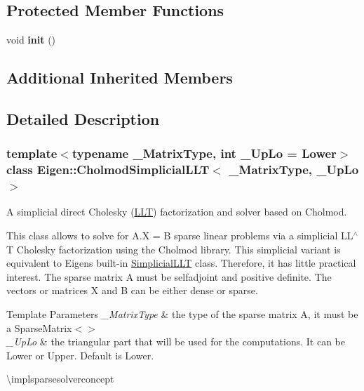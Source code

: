 \subsection*{Protected Member Functions}
\begin{DoxyCompactItemize}
\item 
\mbox{\label{class_eigen_1_1_cholmod_simplicial_l_l_t_a6014655338ba52e480682c73b9da2061}} 
void {\bfseries init} ()
\end{DoxyCompactItemize}
\subsection*{Additional Inherited Members}


\subsection{Detailed Description}
\subsubsection*{template$<$typename \+\_\+\+Matrix\+Type, int \+\_\+\+Up\+Lo = Lower$>$\newline
class Eigen\+::\+Cholmod\+Simplicial\+L\+L\+T$<$ \+\_\+\+Matrix\+Type, \+\_\+\+Up\+Lo $>$}

A simplicial direct Cholesky (\mbox{\hyperlink{class_eigen_1_1_l_l_t}{L\+LT}}) factorization and solver based on Cholmod. 

This class allows to solve for A.\+X = B sparse linear problems via a simplicial L\+L$^\wedge$T Cholesky factorization using the Cholmod library. This simplicial variant is equivalent to Eigen\textquotesingle{}s built-\/in \mbox{\hyperlink{class_eigen_1_1_simplicial_l_l_t}{Simplicial\+L\+LT}} class. Therefore, it has little practical interest. The sparse matrix A must be selfadjoint and positive definite. The vectors or matrices X and B can be either dense or sparse.


\begin{DoxyTemplParams}{Template Parameters}
{\em \+\_\+\+Matrix\+Type} & the type of the sparse matrix A, it must be a Sparse\+Matrix$<$$>$ \\
\hline
{\em \+\_\+\+Up\+Lo} & the triangular part that will be used for the computations. It can be Lower or Upper. Default is Lower.\\
\hline
\end{DoxyTemplParams}
\textbackslash{}implsparsesolverconcept

